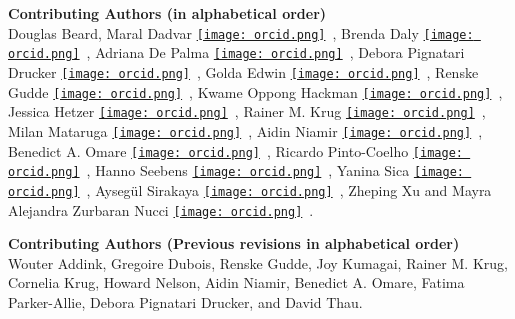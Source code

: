 
\begin{center}

    {\LARGE \textbf{Contributing Authors (in alphabetical order)}} \\[0.5em]
    Douglas Beard, 
    Maral Dadvar \href{https://orcid.org/0000-0002-1351-2561}{\texttt{[image: orcid.png]}}\ , 
    Brenda Daly \href{https://orcid.org/0000-0002-3732-8339}{\texttt{[image: orcid.png]}}\ , 
    Adriana De Palma \href{https://orcid.org/0000-0002-5345-4917}{\texttt{[image: orcid.png]}}\ , 
    Debora Pignatari Drucker \href{https://orcid.org/0000-0003-4177-1322}{\texttt{[image: orcid.png]}}\ , 
    Golda Edwin \href{https://orcid.org/0000-0002-7487-3272}{\texttt{[image: orcid.png]}}\ , 
    Renske Gudde \href{https://orcid.org/0000-0003-4727-1011}{\texttt{[image: orcid.png]}}\ , 
    Kwame Oppong Hackman \href{https://orcid.org/0000-0002-2201-9314}{\texttt{[image: orcid.png]}}\ , 
    Jessica Hetzer \href{https://orcid.org/0000-0002-2384-0024}{\texttt{[image: orcid.png]}}\ , 
    Rainer M. Krug \href{https://orcid.org/0000-0002-7490-0066}{\texttt{[image: orcid.png]}}\ ,
    Milan Mataruga \href{https://orcid.org/0000-0002-9318-7550}{\texttt{[image: orcid.png]}}\ , 
    Aidin Niamir \href{https://orcid.org/0000-0003-4511-3407}{\texttt{[image: orcid.png]}}\ , 
    Benedict A. Omare \href{https://orcid.org/0000-0003-3704-0332}{\texttt{[image: orcid.png]}}\ , 
    Ricardo Pinto-Coelho \href{https://orcid.org/0000-0003-4486-1243}{\texttt{[image: orcid.png]}}\ , 
    Hanno Seebens \href{https://orcid.org/0000-0001-8993-6419}{\texttt{[image: orcid.png]}}\ , 
    Yanina Sica \href{https://orcid.org/0000-0002-1720-0127}{\texttt{[image: orcid.png]}}\ , 
    Aysegül Sirakaya \href{https://orcid.org/0000-0003-3330-1750}{\texttt{[image: orcid.png]}}\ , 
    Zheping Xu 
    and
    Mayra Alejandra Zurbaran Nucci \href{https://orcid.org/0000-0003-1231-3859}{\texttt{[image: orcid.png]}}\ .
    
    {\LARGE \textbf{Contributing Authors (Previous revisions in alphabetical order)}} \\[0.5em]
    Wouter Addink, Gregoire Dubois, Renske Gudde, Joy Kumagai, Rainer M. Krug, Cornelia Krug, Howard Nelson, Aidin Niamir, Benedict A. Omare, Fatima Parker-Allie, Debora Pignatari Drucker, and David Thau.
    

\end{center}
